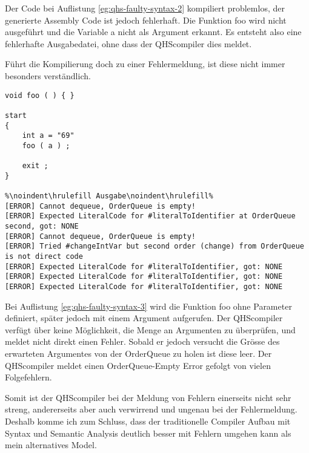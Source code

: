 Der Code bei Auflistung \ref{eg:qhs-faulty-syntax-2} kompiliert problemlos, der generierte Assembly Code ist jedoch fehlerhaft. Die Funktion foo wird nicht ausgeführt und die Variable a nicht als Argument erkannt.
Es entsteht also eine fehlerhafte Ausgabedatei, ohne dass der QHScompiler dies meldet.

Führt die Kompilierung doch zu einer Fehlermeldung, ist diese nicht immer besonders verständlich.

\begin{lstlisting}[language=QHS, caption=QHS mit falscher Anzahl Argumente, label=eg:qhs-faulty-syntax-3]
void foo ( ) { }

start
{
    int a = "69" 
    foo ( a ) ;

    exit ;
}

%\noindent\hrulefill Ausgabe\noindent\hrulefill%
[ERROR] Cannot dequeue, OrderQueue is empty!
[ERROR] Expected LiteralCode for #literalToIdentifier at OrderQueue second, got: NONE
[ERROR] Cannot dequeue, OrderQueue is empty!
[ERROR] Tried #changeIntVar but second order (change) from OrderQueue is not direct code
[ERROR] Expected LiteralCode for #literalToIdentifier, got: NONE
[ERROR] Expected LiteralCode for #literalToIdentifier, got: NONE
[ERROR] Expected LiteralCode for #literalToIdentifier, got: NONE
\end{lstlisting}

Bei Auflistung \ref{eg:qhs-faulty-syntax-3} wird die Funktion foo ohne Parameter definiert, später jedoch mit einem Argument aufgerufen.
Der QHScompiler verfügt über keine Möglichkeit, die Menge an Argumenten zu überprüfen, und meldet nicht direkt einen Fehler. 
Sobald er jedoch versucht die Grösse des erwarteten Argumentes von der OrderQueue zu holen ist diese leer.
Der QHScompiler meldet einen OrderQueue-Empty Error gefolgt von vielen Folgefehlern.


Somit ist der QHScompiler bei der Meldung von Fehlern einerseits nicht sehr streng, andererseits aber auch verwirrend und ungenau bei der Fehlermeldung.
Deshalb komme ich zum Schluss, dass der traditionelle Compiler Aufbau mit Syntax und Semantic Analysis deutlich besser mit Fehlern umgehen kann als mein alternatives Model.

